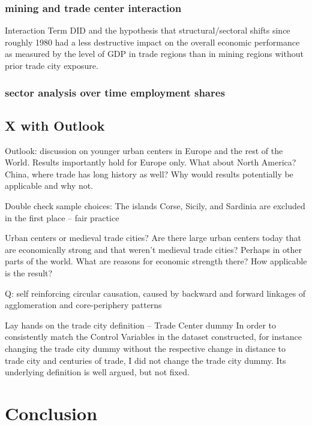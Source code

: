 \documentclass[
12pt, %
english, %
onehalfspacing, %
oneside,
headsepline, %
openany
]{MastersDoctoralThesis} %
\begin{document}
\subsection{mining and trade center interaction}
Interaction Term DID and the hypothesis that structural/sectoral shifts since roughly 1980 had a less destructive impact on the overall economic performance as measured by the level of GDP in trade regions than in mining regions without prior trade city exposure. 

\subsection{sector analysis over time employment shares}

\section{X with Outlook}

Outlook: discussion on younger urban centers in Europe and the rest of the World. Results importantly hold for Europe only. What about North America? China, where trade has long history as well? Why would results potentially be applicable and why not.

Double check sample choices: The islands Corse, Sicily, and Sardinia are excluded in the first place -- fair practice

Urban centers or medieval trade cities? Are there large urban centers today that are economically strong and that weren't medieval trade cities? Perhaps in other parts of the world. What are reasons for economic strength there? How applicable is the result?

Q: self reinforcing circular causation, caused by backward and forward linkages of agglomeration and core-periphery patterns

Lay hands on the trade city definition -- Trade Center dummy
In order to consistently match the Control Variables in the dataset constructed, for instance changing the trade city dummy without the respective change in distance to trade city and centuries of trade, I did not change the trade city dummy. Its underlying definition is well argued, but not fixed.

\newpage

\chapter{Conclusion}
 
 
\appendix %
\end{document}
